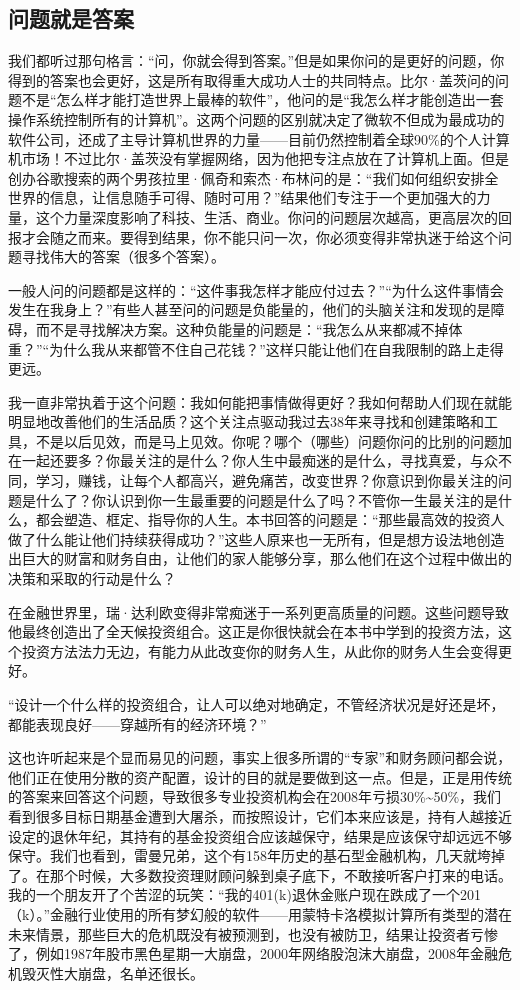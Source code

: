 \subsection{问题就是答案}

我们都听过那句格言：“问，你就会得到答案。”但是如果你问的是更好的问题，你得到的答案也会更好，这是所有取得重大成功人士的共同特点。比尔·盖茨问的问题不是“怎么样才能打造世界上最棒的软件”，他问的是“我怎么样才能创造出一套操作系统控制所有的计算机”。这两个问题的区别就决定了微软不但成为最成功的软件公司，还成了主导计算机世界的力量——目前仍然控制着全球90\%的个人计算机市场！不过比尔·盖茨没有掌握网络，因为他把专注点放在了计算机上面。但是创办谷歌搜索的两个男孩拉里·佩奇和索杰·布林问的是：“我们如何组织安排全世界的信息，让信息随手可得、随时可用？”结果他们专注于一个更加强大的力量，这个力量深度影响了科技、生活、商业。你问的问题层次越高，更高层次的回报才会随之而来。要得到结果，你不能只问一次，你必须变得非常执迷于给这个问题寻找伟大的答案（很多个答案）。

一般人问的问题都是这样的：“这件事我怎样才能应付过去？”“为什么这件事情会发生在我身上？”有些人甚至问的问题是负能量的，他们的头脑关注和发现的是障碍，而不是寻找解决方案。这种负能量的问题是：“我怎么从来都减不掉体重？”“为什么我从来都管不住自己花钱？”这样只能让他们在自我限制的路上走得更远。

我一直非常执着于这个问题：我如何能把事情做得更好？我如何帮助人们现在就能明显地改善他们的生活品质？这个关注点驱动我过去38年来寻找和创建策略和工具，不是以后见效，而是马上见效。你呢？哪个（哪些）问题你问的比别的问题加在一起还要多？你最关注的是什么？你人生中最痴迷的是什么，寻找真爱，与众不同，学习，赚钱，让每个人都高兴，避免痛苦，改变世界？你意识到你最关注的问题是什么了？你认识到你一生最重要的问题是什么了吗？不管你一生最关注的是什么，都会塑造、框定、指导你的人生。本书回答的问题是：“那些最高效的投资人做了什么能让他们持续获得成功？”这些人原来也一无所有，但是想方设法地创造出巨大的财富和财务自由，让他们的家人能够分享，那么他们在这个过程中做出的决策和采取的行动是什么？

在金融世界里，瑞·达利欧变得非常痴迷于一系列更高质量的问题。这些问题导致他最终创造出了全天候投资组合。这正是你很快就会在本书中学到的投资方法，这个投资方法法力无边，有能力从此改变你的财务人生，从此你的财务人生会变得更好。

“设计一个什么样的投资组合，让人可以绝对地确定，不管经济状况是好还是坏，都能表现良好——穿越所有的经济环境？”

这也许听起来是个显而易见的问题，事实上很多所谓的“专家”和财务顾问都会说，他们正在使用分散的资产配置，设计的目的就是要做到这一点。但是，正是用传统的答案来回答这个问题，导致很多专业投资机构会在2008年亏损30\%\textasciitilde{}50\%，我们看到很多目标日期基金遭到大屠杀，而按照设计，它们本来应该是，持有人越接近设定的退休年纪，其持有的基金投资组合应该越保守，结果是应该保守却远远不够保守。我们也看到，雷曼兄弟，这个有158年历史的基石型金融机构，几天就垮掉了。在那个时候，大多数投资理财顾问躲到桌子底下，不敢接听客户打来的电话。我的一个朋友开了个苦涩的玩笑：“我的401(k)退休金账户现在跌成了一个201（k）。”金融行业使用的所有梦幻般的软件——用蒙特卡洛模拟计算所有类型的潜在未来情景，那些巨大的危机既没有被预测到，也没有被防卫，结果让投资者亏惨了，例如1987年股市黑色星期一大崩盘，2000年网络股泡沫大崩盘，2008年金融危机毁灭性大崩盘，名单还很长。

